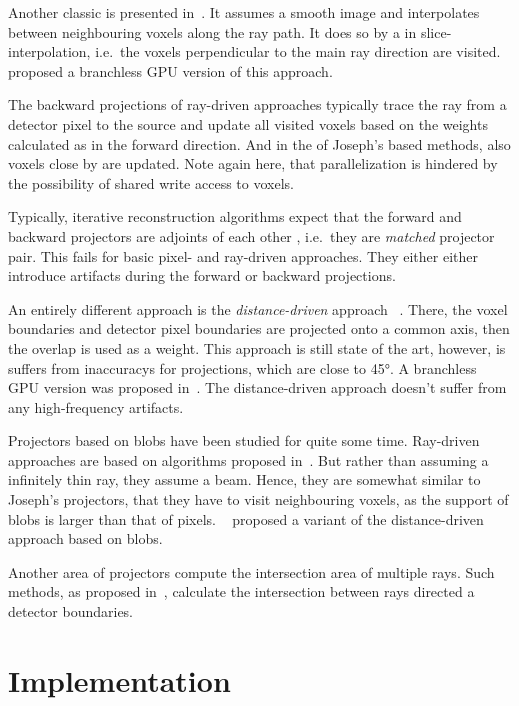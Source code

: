 Another classic is presented in~\cite{joseph_improved_1982}. It assumes a smooth image and
interpolates between neighbouring voxels along the ray path. It does so by a in slice-interpolation,
i.e.\ the voxels perpendicular to the main ray direction are visited.~\cite{graetz_high_2020}
proposed a branchless GPU version of this approach.

The backward projections of ray-driven approaches typically trace the ray from a detector pixel to
the source and update all visited voxels based on the weights calculated as in the forward
direction. And in the of Joseph's based methods, also voxels close by are updated. Note again here,
that parallelization is hindered by the possibility of shared write access to voxels.

Typically, iterative reconstruction algorithms expect that the forward and backward projectors are
adjoints of each other , i.e.\ they are
\textit{matched} projector pair. This fails for basic pixel- and ray-driven approaches.
They either either introduce artifacts during the forward or backward projections.

An entirely different approach is the \textit{distance-driven} approach
~\cite{de_man_distance-driven_2002, de_man_distance-driven_2004}. There, the voxel boundaries and
detector pixel boundaries are projected onto a common axis, then the overlap is used as a weight.
This approach is still state of the art, however, is suffers from inaccuracys for projections, which
are close to 45°. A branchless GPU version was proposed in~\cite{liu_gpu-based_2017}. The
distance-driven approach doesn't suffer from any high-frequency artifacts.

Projectors based on blobs have been studied for quite some time. Ray-driven approaches are based on
algorithms proposed in~\cite{matej_practical_1996, popescu_ray_2004}. But rather than assuming a
infinitely thin ray, they assume a beam. Hence, they are somewhat similar to Joseph's projectors,
that they have to visit neighbouring voxels, as the support of blobs is larger than that of pixels.
~\cite{levakhina_distance-driven_2010} proposed a variant of the distance-driven approach based on
blobs.

Another area of projectors compute the intersection area of multiple rays. Such methods, as proposed
in~\cite{ha_study_2015, ha_efficient_2016, ha_look-up_2018}, calculate the intersection between rays
directed a detector boundaries.

\section{Implementation}\label{sec:implementation}


